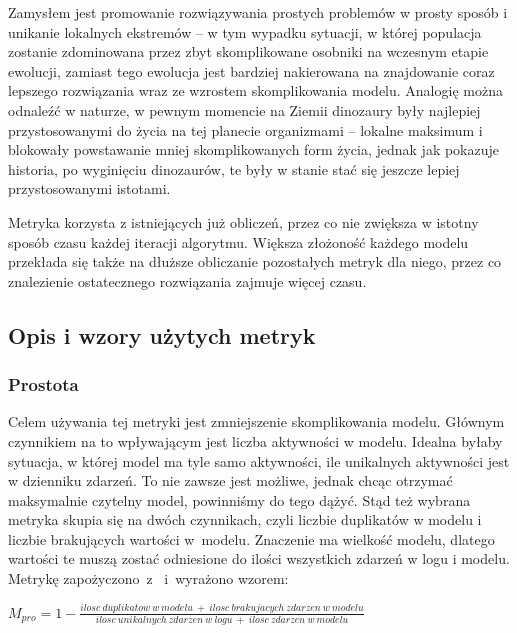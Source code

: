Zamysłem jest promowanie rozwiązywania prostych problemów w prosty sposób i unikanie lokalnych ekstremów -- w tym wypadku sytuacji, w której populacja zostanie zdominowana przez zbyt skomplikowane osobniki na wczesnym etapie ewolucji, zamiast tego ewolucja jest bardziej nakierowana na znajdowanie coraz lepszego rozwiązania wraz ze wzrostem skomplikowania modelu. Analogię można odnaleźć w naturze, w pewnym momencie na Ziemii dinozaury były najlepiej przystosowanymi do życia na tej planecie organizmami -- lokalne maksimum i blokowały powstawanie mniej skomplikowanych form życia, jednak jak pokazuje historia, po wyginięciu dinozaurów, te były w stanie stać się jeszcze lepiej przystosowanymi istotami.

Metryka korzysta z istniejących już obliczeń, przez co nie zwiększa w istotny sposób czasu każdej iteracji algorytmu. Większa złożoność każdego modelu przekłada się także na dłuższe obliczanie pozostałych metryk dla niego, przez co znalezienie ostatecznego rozwiązania zajmuje więcej czasu.


\subsection{Opis i wzory użytych metryk}
\label{sec:metrics-details}
\subsubsection{Prostota}  
Celem używania tej metryki jest zmniejszenie skomplikowania modelu. Głównym czynnikiem na to wpływającym jest liczba aktywności w modelu. Idealna byłaby sytuacja, w której model ma tyle samo aktywności, ile unikalnych aktywności jest w dzienniku zdarzeń. To nie zawsze jest możliwe, jednak chcąc otrzymać maksymalnie czytelny model, powinniśmy do tego dążyć. Stąd też wybrana metryka skupia się na dwóch czynnikach, czyli liczbie duplikatów w modelu i liczbie brakujących wartości w~modelu. Znaczenie ma wielkość modelu, dlatego wartości te muszą zostać odniesione do ilości wszystkich zdarzeń w logu i modelu. Metrykę zapożyczono~z~\cite{qd-in-discovery} i~wyrażono wzorem: \begin{center}
$M_{pro} = 1 - \frac{ilosc\ duplikatow\ w\ modelu\ +\ ilosc\ brakujacych\ zdarzen\ w\ modelu}{ilosc\ unikalnych\ zdarzen\ w\ logu\ +\ ilosc\ zdarzen\ w\ modelu}$
\end{center}
